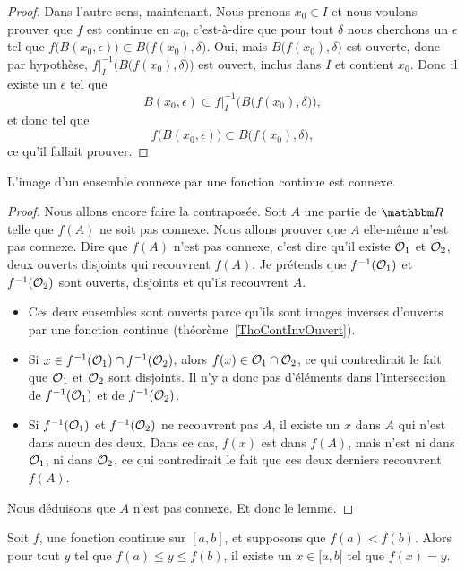 \begin{proof}
Dans l'autre sens, maintenant. Nous prenons $x_0\in I$ et nous voulons prouver que $f$ est continue en $x_0$, c'est-à-dire que pour tout $\delta$ nous cherchons un $\epsilon$ tel que $f\big( B(x_0,\epsilon) \big)\subset B\big( f(x_0),\delta \big)$. Oui, mais $B\big( f(x_0),\delta \big)$ est ouverte, donc par hypothèse, $f|_I^{-1}\Big( B\big( f(x_0),\delta \big) \Big)$ est ouvert, inclus dans $I$ et contient $x_0$. Donc il existe un $\epsilon$ tel que
\[
  B(x_0,\epsilon)\subset f|_I^{-1}\Big( B\big( f(x_0),\delta \big) \Big),
\]
et donc tel que
\[
  f\big( B(x_0,\epsilon) \big)\subset B\big( f(x_0),\delta \big),
\]
ce qu'il fallait prouver.
\end{proof}

\begin{lemma}   \label{LemConncontconn}
L'image d'un ensemble connexe par une fonction continue est connexe.
\end{lemma}

\begin{proof}
Nous allons encore faire la contraposée. Soit $A$ une partie de $\eR$ telle que $f(A)$ ne soit pas connexe. Nous allons prouver que $A$ elle-même n'est pas connexe. Dire que $f(A)$ n'est pas connexe, c'est dire qu'il existe $\mathcal{O}_1$ et $\mathcal{O}_2$, deux ouverts disjoints qui recouvrent $f(A)$. Je prétends que $f^{-1}(\mathcal{O}_1)$ et $f^{-1}(\mathcal{O}_2)$ sont ouverts, disjoints et qu'ils recouvrent $A$.
\begin{itemize}
\item Ces deux ensembles sont ouverts parce qu'ils sont images inverses d'ouverts par une fonction continue (théorème~\ref{ThoContInvOuvert}).
\item Si $x\in f^{-1}(\mathcal{O}_1)\cap f^{-1}(\mathcal{O}_2)$, alors $f(x)\in \mathcal{O}_1\cap\mathcal{O}_2$, ce qui contredirait le fait que $\mathcal{O}_1$ et $\mathcal{O}_2$ sont disjoints. Il n'y a donc pas d'éléments dans l'intersection de $f^{-1}(\mathcal{O}_1)$ et de $f^{-1}(\mathcal{O}_2)$.
\item Si $f^{-1}(\mathcal{O}_1)$ et $f^{-1}(\mathcal{O}_2)$ ne recouvrent pas $A$, il existe un $x$ dans $A$ qui n'est dans aucun des deux. Dans ce cas, $f(x)$ est dans $f(A)$, mais n'est ni dans $\mathcal{O}_1$, ni dans $\mathcal{O}_2$, ce qui contredirait le fait que ces deux derniers recouvrent $f(A)$.
\end{itemize}
Nous déduisons que $A$ n'est pas connexe. Et donc le lemme.
\end{proof}

\begin{theorem}        \label{ThoValInter}
    Soit $f$, une fonction continue sur $[a,b]$, et supposons que $f(a)<f(b)$. Alors pour tout $y$ tel que $f(a)\leq y\leq f(b)$, il existe un \( x\in\mathopen[ a , b \mathclose]\) tel que $f(x)=y$.
\end{theorem}

